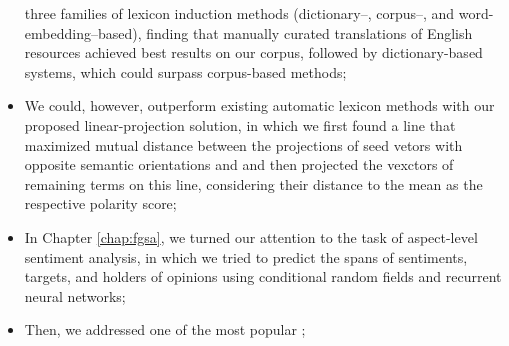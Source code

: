 \begin{itemize}
  three families of
  lexicon induction methods (dictionary--, corpus--, and
  word-embedding--based), finding that manually curated translations
  of English resources achieved best results on our corpus, followed
  by dictionary-based systems, which could surpass corpus-based
  methods;
\item We could, however, outperform existing automatic lexicon methods
  with our proposed linear-projection solution, in which we first
  found a line that maximized mutual distance between the projections
  of seed vetors with opposite semantic orientations and and then
  projected the vexctors of remaining terms on this line, considering
  their distance to the mean as the respective polarity score;
\item In Chapter \ref{chap:fgsa}, we turned our attention to the task
  of aspect-level sentiment analysis, in which we tried to predict the
  spans of sentiments, targets, and holders of opinions using
  conditional random fields and recurrent neural networks;
\item Then, we addressed one of the most popular ;
\end{itemize}
